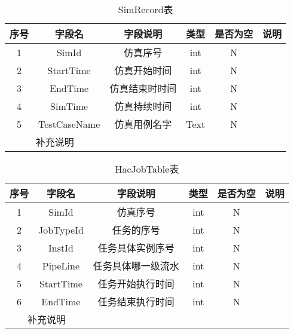 \begin{table}[!h]
    \centering\normalsize
    \caption{SimRecord表}
    \begin{tabular}{|c|c|c|c|c|c|}
    \hline
    \textbf{序号} & \textbf{字段名} & \textbf{字段说明} & \textbf{类型} & \textbf{是否为空} & \textbf{说明} \\ \hline
    1           & SimId        & 仿真序号          & int         & N             &             \\ \hline
    2           & StartTime    & 仿真开始时间        & int         & N             &             \\ \hline
    3           & EndTime      & 仿真结束时时间       & int         & N             &             \\ \hline
    4           & SimTime      & 仿真持续时间        & int         & N             &             \\ \hline
    5           & TestCaseName & 仿真用例名字        & Text        & N             &             \\ \hline
    \multicolumn{2}{|c|}{补充说明} &               &             &               &             \\ \hline
    \end{tabular}
    \end{table}

    \begin{table}[!h]
        \centering\normalsize
        \caption{HacJobTable表}
        \begin{tabular}{|c|c|c|c|c|c|}
        \hline
        \textbf{序号} & \textbf{字段名} & \textbf{字段说明} & \textbf{类型} & \textbf{是否为空} & \textbf{说明} \\ \hline
        1           & SimId        & 仿真序号          & int         & N             &             \\ \hline
        2           & JobTypeId    & 任务的序号         & int         & N             &             \\ \hline
        3           & InstId       & 任务具体实例序号      & int         & N             &             \\ \hline
        4           & PipeLine     & 任务具体哪一级流水     & int         & N             &             \\ \hline
        5           & StartTime    & 任务开始执行时间      & int         & N             &             \\ \hline
        6           & EndTime      & 任务结束执行时间      & int         & N             &             \\ \hline
        \multicolumn{2}{|c|}{补充说明} &               &             &               &             \\ \hline
        \end{tabular}
        \end{table}

